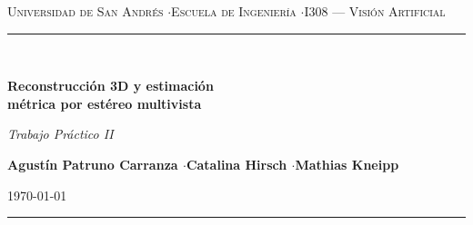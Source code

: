 \documentclass[10pt,a4paper]{article}
\begin{document}
\begingroup
\centering
{\footnotesize\scshape\color{black!70} Universidad de San Andrés \quad$\cdot$\quad Escuela de Ingeniería \quad$\cdot$\quad I308 --- Visión Artificial}\\[4pt]
{\color{black!25}\rule{\linewidth}{0.6pt}}\\[10pt]
{\fontsize{20}{24}\selectfont\bfseries\color{black}
Reconstrucción 3D y estimación\\[2pt]
métrica por estéreo multivista\par}
\vspace{6pt}
{\normalsize\itshape\color{black!70} Trabajo Práctico II\par}
\vspace{10pt}
{\normalsize\bfseries Agustín Patruno Carranza \quad$\cdot$\quad Catalina Hirsch \quad$\cdot$\quad Mathias Kneipp\par}
\vspace{2pt}
{\footnotesize\color{black!60}\today\par}
\vspace{4pt}
{\color{black!25}\rule{\linewidth}{0.6pt}}
\endgroup
\vspace{10pt}

\begin{abstract}
\noindent
Se presenta un pipeline de reconstrucción 3D por estéreo multivista que, a partir de
pares RGB capturados con una cámara estéreo, recupera la nube de puntos de un objeto
y estima sus dimensiones en una escala métrica nominal. El sistema se calibró manualmente con OpenCV
(error de reproyección estéreo RMS de $0.86$~px y línea base de $60.16$~mm), se calculó
la disparidad con \texttt{StereoSGBM} y filtrado WLS, y se fusionaron las nubes locales
en un marco común mediante poses estimadas respecto de un tablero ChArUco con
\texttt{solvePnP}, obteniendo una nube global de $20\,762\,218$ puntos. Tras el recorte
espacial, submuestreo y eliminación de outliers en Open3D, y la segmentación del objeto
(remoción del plano base y mayor grupo DBSCAN), la nube del Palacio conserva $155\,401$
puntos ($4.2$~MB). La caja de recorte se eligió holgada, de modo que el objeto queda con
margen claro en los tres ejes y la medición es independiente del recorte. La extensión
robusta (percentiles $0{,}5$--$99{,}5$) es $108.4\times371.7\times108.4$~mm (ancho, largo y
alto); frente a las medidas físicas desde la base ($120\times380\times115$~mm), las tres
dimensiones robustas subestiman levemente el objeto (largo $2{,}2\%$, alto $5{,}7\%$, ancho
$9{,}7\%$), siendo el ancho —la dimensión más angosta— la peor estimada, mientras que la AABB
las sobreestima por el engrosamiento de las superficies. La escala sigue pendiente de
validación física de los patrones. Se discuten las limitaciones del empalme y la medición.
\end{abstract}
\end{document}
